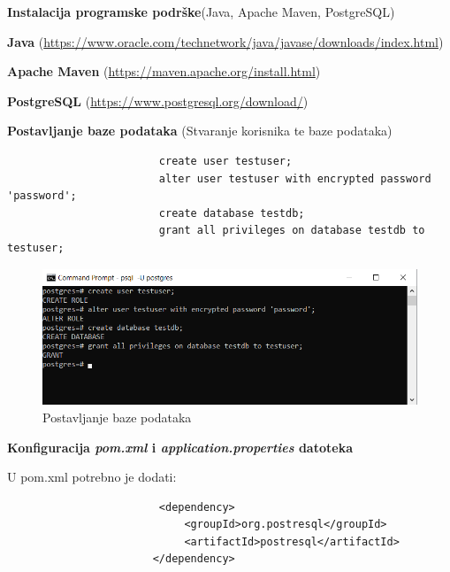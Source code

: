 		
		   	\noindent {}
		   	\begin{packed_enum}
				
					\item \textbf{Instalacija programske podrške}(Java, Apache Maven, PostgreSQL)
    					\begin{packed_item}
                			\item \textbf{Java} (\url{https://www.oracle.com/technetwork/java/javase/downloads/index.html})
                			\item \textbf{Apache Maven} (\url{https://maven.apache.org/install.html})
                			\item \textbf{PostgreSQL} (\url{https://www.postgresql.org/download/})
    		      \end{packed_item}
					\item \textbf{Postavljanje baze podataka} (Stvaranje korisnika te baze podataka)
					    \begin{verbatim}
					    create user testuser;
					    alter user testuser with encrypted password 'password';
					    create database testdb;
					    grant all privileges on database testdb to testuser;
			            \end{verbatim}
			            
    					\begin{figure}[H]
    					\includegraphics[width=\linewidth]{slike/backend/psqlsetup.png}
    					\centering
    					\caption{Postavljanje baze podataka}
    					\label{fig:PSQL-setup}
    		            \end{figure}
    		            
		            \item \textbf{Konfiguracija \textit{pom.xml} i \textit{application.properties} datoteka}
		                \begin{packed_item}
                			\item {U pom.xml potrebno je dodati:} 
                			\begin{verbatim}
					    <dependency>
					        <groupId>org.postresql</groupId>
					        <artifactId>postresql</artifactId>
					   </dependency>
			            \end{verbatim}
                			    

\end{packed_item}
\end{packed_enum}
